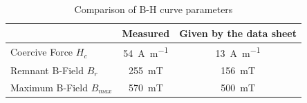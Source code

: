 \begin{table}[H]
    \centering
    \caption{Comparison of B-H curve parameters \cite{ferroxcubeProductSpecificationsCore2016}}
    \begin{tabular}{|l|c|c|}
        \hline
        & Measured & Given by the data sheet \\
        \hline
        Coercive Force $H_c$ & \SI{54}{\A\per\m} & \SI{13}{\A\per\m}\\ 
        \hline
        Remnant B-Field $B_r$ & \SI{255}{\milli\tesla} & \SI{156}{\milli\tesla}\\
        \hline
        Maximum B-Field $B_{max}$ & \SI{570}{\milli\tesla} & \SI{500}{\milli\tesla}\\
        \hline
    \end{tabular}
    \label{tab:B-H_curve_points_of_interest_comparison}
\end{table}



















